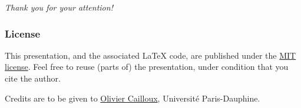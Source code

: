 \documentclass[french,english]{beamer}
\begin{document}
\begin{frame}[plain]
	\addtocounter{framenumber}{-1}
	\begin{center}
		\huge
		\textit{Thank you for your attention!}
	\end{center}
\end{frame}

\appendix
\AtBeginSection{
}

\clearpage{}
\begin{frame}[allowframebreaks]
	\frametitle{\refname}
 	
\end{frame}

\clearpage{}
\begin{frame}[plain]
	\frametitle{License}
	This presentation, and the associated \LaTeX{} code, are published under the \href{http://opensource.org/licenses/MIT}{MIT license}. Feel free to reuse (parts of) the presentation, under condition that you cite the author.
	
	Credits are to be given to \href{http://www.lamsade.dauphine.fr/~ocailloux/}{Olivier Cailloux}, Université Paris-Dauphine.
\end{frame}
\addtocounter{framenumber}{-1}
\end{document}
